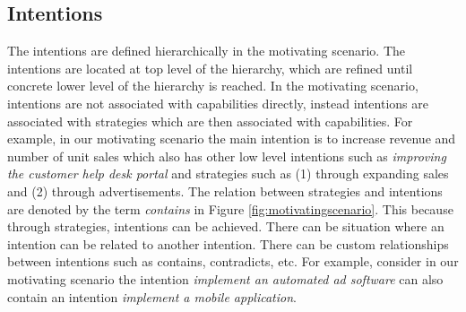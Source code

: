 \subsection{Intentions} 
\label{sec:intentions}
The intentions are defined hierarchically in the motivating scenario. The intentions are located at top level of the hierarchy, which are refined until concrete lower level of the hierarchy is reached. In the motivating scenario, intentions are not associated with capabilities directly, instead intentions are associated with strategies which are then associated with capabilities. For example, in our motivating scenario the main intention is to increase revenue and number of unit sales which also has other low level intentions such as \textit{improving the customer help desk portal} and strategies such as (1) through expanding sales and (2) through advertisements. The relation between strategies and intentions are denoted by the term \textit{contains} in Figure \ref{fig:motivatingscenario}. This because through strategies, intentions can be achieved. There can be situation where an intention can be related to another intention. There can be custom relationships between intentions such as contains, contradicts, etc. For example, consider in our motivating scenario the intention \textit{implement an automated ad software} can also contain an intention \textit{implement a mobile application}.  


